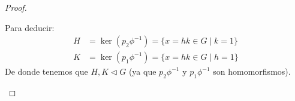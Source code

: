 \begin{teo}
\begin{proof}
\begin{description}
\begin{itemize}
\begin{figure}[H]
                        \end{figure}
                        Para deducir:
                        \begin{align*}
                            H &= \ker(p_2\phi^{-1}) = \{x=hk\in G \mid k = 1\} \\
                            K &= \ker(p_1\phi^{-1}) = \{x=hk\in G \mid h = 1\}
                        \end{align*}
                        De donde tenemos que $H,K\lhd G$ (ya que $p_2\phi^{-1}$ y $p_1\phi^{-1}$ son homomorfismos).
                \end{itemize}


\end{description}
\end{proof}
\end{teo}
